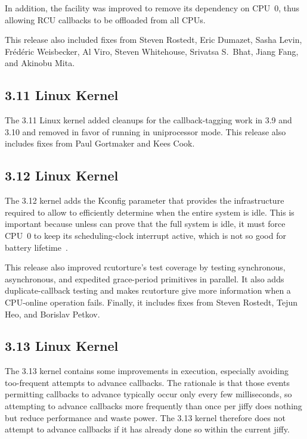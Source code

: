 In addition, the  facility was improved to
remove its dependency on CPU~0, thus allowing RCU callbacks to be offloaded
from all CPUs.

This release also included fixes from Steven Rostedt, Eric Dumazet,
Sasha Levin, Fr\'ed\'eric Weisbecker, Al Viro, Steven Whitehouse,
Srivatsa S.~Bhat, Jiang Fang, and Akinobu Mita.

\subsection{3.11 Linux Kernel}

The 3.11 Linux kernel added cleanups for the callback-tagging work
in 3.9 and 3.10 and removed  in favor of running
 in uniprocessor mode.
This release also includes fixes from Paul Gortmaker and Kees Cook.

\subsection{3.12 Linux Kernel}

The 3.12 kernel adds the  Kconfig
parameter that provides the infrastructure required to allow
 to efficiently determine when the entire
system is idle.
This is important because unless  can prove
that the full system is idle, it must force CPU~0 to keep its
scheduling-clock interrupt active, which is not so good for battery
lifetime~\cite{JonathanCorbet2013SYSIDLE}.

This release also improved rcutorture's test coverage by testing
synchronous, asynchronous, and expedited grace-period primitives
in parallel.
It also adds duplicate-callback testing and makes rcutorture give
more information when a CPU-online operation fails.
Finally, it includes fixes from Steven Rostedt, Tejun Heo, and Borislav
Petkov.

\subsection{3.13 Linux Kernel}

The 3.13 kernel contains some improvements in 
execution, especially avoiding too-frequent attempts to advance callbacks.
The rationale is that those events permitting callbacks to advance
typically occur only every few milliseconds, so attempting to advance callbacks
more frequently than once per jiffy does nothing but reduce performance and
waste power.
The 3.13 kernel therefore does not attempt to advance callbacks if it
has already done so within the current jiffy.

